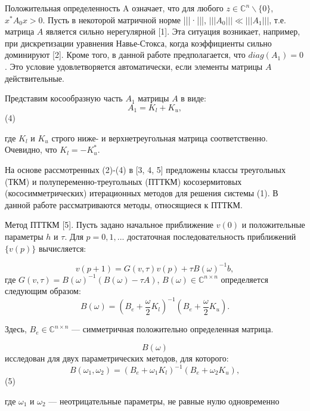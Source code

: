 \documentclass{article}
\begin{document}
Положительная определенность A означает, что для любого \( z \in \mathbb{C}^n \backslash \{0\} \), \( x^*A_0x > 0 \). Пусть в некоторой матричной норме |||·|||, \( |||A_0||| \ll |||A_1||| \), т.е. матрица \( A \) является сильно нерегулярной [1]. Эта ситуация возникает, например, при дискретизации уравнения Навье-Стокса, когда коэффициенты сильно доминируют [2]. Кроме того, в данной работе предполагается, что \( diag(A_1) = 0 \). Это условие удовлетворяется автоматически, если элементы матрицы \( A \) действительные.

Представим косообразную часть \( A_1 \) матрицы \( A \) в виде:
\[ A_1 = K_l + K_u, \] (4)

где \( K_l \) и \( K_u \) строго ниже- и верхнетреугольная матрица соответственно. Очевидно, что \( K_l = -K^*_u \).

На основе рассмотренных (2)-(4) в [3, 4, 5] предложены классы треугольных (ТКМ) и полупеременно-треугольных (ПТТКМ) косозермитовых (кососимметрических) итерационных методов для решения системы (1). В данной работе рассматриваются методы, относящиеся к ПТТКМ.

Метод ПТТКМ [5]. Пусть задано начальное приближение \( v(0) \) и положительные параметры \( h \) и \( \tau \). Для \( p = 0,1, ... \) достаточная последовательность приближений \( \{v(p)\} \) вычисляется:

\[ v(p+1) = G(v, \tau)v(p) + \tau B(\omega)^{-1}b, \]
где \( G(v, \tau) = B(\omega)^{-1}(B(\omega) - \tau A) \), \( B(\omega) \in \mathbb{C}^{n \times n} \) определяется следующим образом:
\[ B(\omega) = (B_e + \frac{\omega}{2} K_l)^{-1}(B_e + \frac{\omega}{2} K_u). \]

Здесь, \( B_e \in \mathbb{C}^{n \times n} \) — симметричная положительно определенная матрица.

\[ B(\omega) \] исследован для двух параметрических методов, для которого:
\[ B(\omega_1, \omega_2) = (B_e + \omega_1 K_l)^{-1}(B_e + \omega_2 K_u), \] (5)

где \( \omega_1 \) и \( \omega_2 \) —  неотрицательные параметры, не равные нулю одновременно
\end{document}
